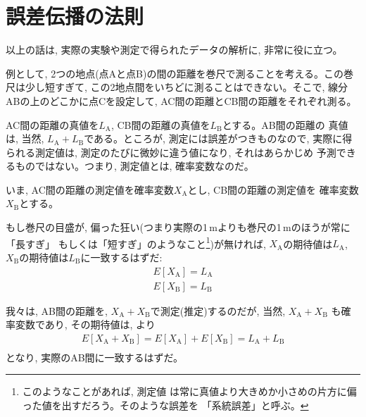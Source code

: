 \section{誤差伝播の法則}

以上の話は, 実際の実験や測定で得られたデータの解析に, 非常に役に立つ。

例として, 2つの地点(点Aと点B)の間の距離を巻尺で測ることを考える。この巻尺は少し短すぎて, 
この2地点間をいちどに測ることはできない。そこで, 線分ABの上のどこかに点Cを設定して, 
AC間の距離とCB間の距離をそれぞれ測る。

AC間の距離の真値を$L_{\text{A}}$, CB間の距離の真値を$L_{\text{B}}$とする。AB間の距離の
真値は, 当然, $L_{\text{A}}+L_{\text{B}}$である。ところが, 測定には誤差がつきものなので, 
実際に得られる測定値は, 測定のたびに微妙に違う値になり, それはあらかじめ
予測できるものではない。つまり, 測定値とは, 確率変数なのだ。

いま, AC間の距離の測定値を確率変数$X_{\text{A}}$とし, CB間の距離の測定値を
確率変数$X_{\text{B}}$とする。

もし巻尺の目盛が, 偏った狂い(つまり実際の1$\,$mよりも巻尺の1$\,$mのほうが常に「長すぎ」
もしくは「短すぎ」のようなこと\footnote{このようなことがあれば, 測定値
は常に真値より大きめか小さめの片方に偏った値を出すだろう。そのような誤差を
「系統誤差」と呼ぶ。})が無ければ, $X_{\text{A}}$の期待値は$L_{\text{A}}$, 
$X_{\text{B}}$の期待値は$L_{\text{B}}$に一致するはずだ: 
\begin{eqnarray}
E[X_{\text{A}}]=L_{\text{A}}\label{eq:EXALA}\\
E[X_{\text{B}}]=L_{\text{B}}\label{eq:EXBLB}
\end{eqnarray}

我々は, AB間の距離を, $X_{\text{A}}+X_{\text{B}}$で測定(推定)するのだが, 当然, $X_{\text{A}}+X_{\text{B}}$
も確率変数であり, その期待値は, より
\begin{eqnarray}
E[X_{\text{A}}+X_{\text{B}}]=E[X_{\text{A}}]+E[X_{\text{B}}]=L_{\text{A}}+L_{\text{B}}\nonumber\\
\end{eqnarray}
となり, 実際のAB間に一致するはずだ。

